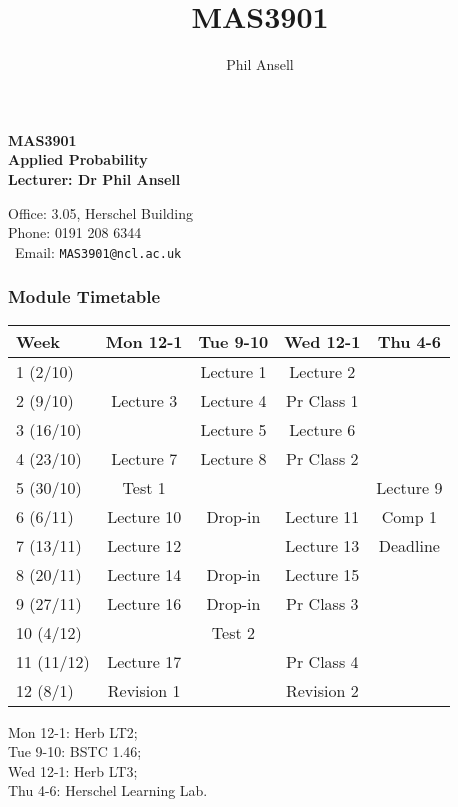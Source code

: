\documentclass[serif,10pt,compress]{beamer}
\title{MAS3901}
\author{Phil Ansell}
\institute{MAS3901@ncl.ac.uk}
\date{}
\newcommand{\cellcolor}[2][white]{}
\begin{document}
\begin{frame}
\begin{center}
\Huge
\textbf{MAS3901} \\
\textbf{Applied Probability}\\
\vspace{0.1cm}
\huge
\textbf{Lecturer: Dr Phil Ansell}
\vspace{0.2cm}

Office: \textsf{3.05, Herschel Building} \\ Phone: \textsf{0191 208 6344} \\ \ Email: \texttt{MAS3901@ncl.ac.uk} 
\vspace{0.2cm}
\end{center}
\end{frame}

\begin{frame}[t]
	\frametitle{Module Timetable}
	\begin{center}
		\begin{tabular}{|l||c|c|c|c|}
			\hline
			Week & Mon 12-1 & Tue 9-10 & Wed 12-1 & Thu 4-6 \\
			\hline
			1 (2/10) &  & \cellcolor[gray]{0.5} Lecture 1 & \cellcolor[gray]{0.5} Lecture 2 &  \\
			\hline
			2 (9/10) & \cellcolor[gray]{0.5} Lecture 3 & \cellcolor[gray]{0.5} Lecture 4 & \cellcolor[gray]{0.5} Pr Class 1 & \\
			\hline
			3 (16/10) & & \cellcolor[gray]{0.5} Lecture 5 & \cellcolor[gray]{0.5} Lecture 6& \\
			\hline
			4 (23/10) & \cellcolor[gray]{0.5} Lecture 7 & \cellcolor[gray]{0.5} Lecture 8 & \cellcolor[gray]{0.5} Pr Class 2 &  \\
			\hline
			5 (30/10) & \cellcolor[gray]{0.5} Test 1 & & & \cellcolor[gray]{0.8} Lecture 9 \\
			\hline
			6 (6/11) & \cellcolor[gray]{0.65} Lecture 10 & \cellcolor[gray]{0.65} Drop-in & \cellcolor[gray]{0.65} Lecture 11  & \cellcolor[gray]{0.8} Comp 1 \\
			\hline
			7 (13/11) & \cellcolor[gray]{0.65} Lecture 12 &  & \cellcolor[gray]{0.65} Lecture 13 & \cellcolor[gray]{0.8} Deadline \\
			\hline
			8 (20/11) & \cellcolor[gray]{0.65} Lecture 14 & \cellcolor[gray]{0.65} Drop-in & \cellcolor[gray]{0.65} Lecture 15 &  \\
			\hline
			9 (27/11) & \cellcolor[gray]{0.65} Lecture 16 & \cellcolor[gray]{0.65} Drop-in & \cellcolor[gray]{0.65} Pr Class 3 &  \\
			\hline
			10 (4/12) & &\cellcolor[gray]{0.65} Test 2 & &  \\
			\hline
			11 (11/12) & \cellcolor[gray]{0.5} Lecture 17 & & \cellcolor[gray]{0.5} Pr Class 4 & \\
			\hline
			12 (8/1) & Revision 1 & & Revision 2 & \\
			\hline
		\end{tabular}
	\end{center}
	Mon 12-1: Herb LT2; \\
	Tue 9-10: BSTC 1.46; \\
	Wed 12-1: Herb LT3; \\
	Thu 4-6: Herschel Learning Lab.
\end{frame}
\end{document}
